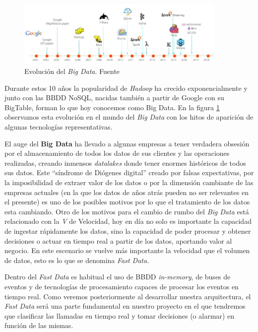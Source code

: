 \begin{figure}[!ht]
	\centering
	\includegraphics[width=0.90\textwidth]{images/arte/bigdatatime}
	\caption{Evolución del \textit{Big Data}. Fuente \cite{lambdakappa}}
	\label{fig:bigdatatime}
\end{figure}


Durante estos 10 años la popularidad de \textit{Hadoop} ha crecido exponencialmente y junto con las BBDD NoSQL, nacidas también a partir de Google con su BigTable, forman lo que hoy conocemos como Big Data. En la figura \ref{fig:bigdatatime} observamos esta evolución en el mundo del \textit{Big Data} con los hitos de aparición de algunas tecnologías representativas.



El auge del \textbf{Big Data} ha llevado a algunas empresas a tener verdadera obsesión por el almacenamiento de todos los datos de sus clientes y las operaciones realizadas, creando inmensos \textit{datalakes} donde tener enormes históricos de todos sus datos. Este ``síndrome de Diógenes digital'' creado por falsas expectativas, por la imposibilidad de extraer valor de los datos o por la dimensión cambiante de las empresas actuales (en la que los datos de años atrás pueden no ser relevantes en el presente) es uno de los posibles motivos por lo que el tratamiento de los datos esta cambiando. Otro de los motivos para el cambio de rumbo del \textit{Big Data} está relacionado con la \textit{V} de Velocidad, hoy en día no solo es importante la capacidad de ingestar rápidamente los datos, sino la capacidad de poder procesar y obtener decisiones o actuar en tiempo real a partir de los datos, aportando valor al negocio. En este escenario se vuelve más importante la velocidad que el volumen de datos, esto es lo que se denomina \textit{Fast Data}. 



Dentro del \textit{Fast Data} es habitual el uso de BBDD \textit{in-memory}, de buses de eventos y de tecnologías de procesamiento capaces de procesar los eventos en tiempo real. Como veremos posteriormente al desarrollar nuestra arquitectura, el \textit{Fast Data} será una parte fundamental en nuestro proyecto en el que tendremos que clasificar las llamadas en tiempo real y tomar decisiones (o alarmar) en función de las mismas. 

